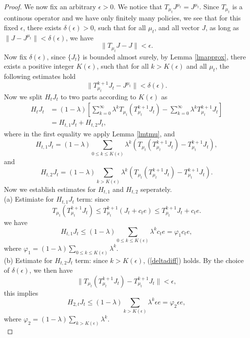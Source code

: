 \documentclass[12pt,a4paper]{amsart}
\numberwithin{equation}{section}
\theoremstyle{plain}
\theoremstyle{definition}
\begin{document}
\begin{proof}
	We now fix an arbitrary $\epsilon > 0$. We notice that $T_{\mu_t} J^{\mu_t}  = J^{\mu_t}$. Since $T_{\mu_t}$ is a continous operator and we have only finitely many policies, we see that for this fixed $\epsilon$, there exists $\delta(\epsilon) > 0$, such that for all $\mu_t$, and all vector $J$,  as long as $\|J - J^{\mu_t}\| < \delta(\epsilon)$, we have
	$$
	\| T_{\mu_t} J - J \| < \epsilon. 
	$$ 
	Now fix $\delta(\epsilon)$, since $\{J_t\}$ is bounded almost surely, by Lemma \ref{lmapprox},  there exists a positive integer $K(\epsilon)$, such that for all $k > K(\epsilon)$ and all $\mu_t$, the following estimates hold
	\begin{equation} \label{deltadiff}
	\| T_{\mu_t}^{k+1} J_t - J^{\mu_t}\| < \delta(\epsilon).
	\end{equation}
	Now we split $H_t J_t$ to two parts according to $K(\epsilon)$ as
	\begin{equation}\label{h1h2}
	\begin{aligned}
	H_t J_t & = (1-\lambda) \left[\sum_{k=0}^{\infty} \lambda^k T_{\mu_t} \left( T_{\mu_t}^{k+1} J_t \right)-  \sum_{k=0}^{\infty} \lambda^k T_{\mu_t}^{k+1} J_t \right]  \\
	& = H_{t, 1} J_t+ H_{t, 2} J_t,
	\end{aligned}
	\end{equation}
	where in the first equality we apply Lemma \ref{lmtmu}, and 
	$$
	H_{t, 1} J_t = (1-\lambda) \sum_{0 \le k\le K(\epsilon)} \lambda^k \left( T_{\mu_t} (T_{\mu_t}^{k+1} J_t) - T_{\mu_t}^{k+1}J_t \right), 
	$$
	and 
	$$
	H_{t, 2} J_t =  (1-\lambda) \sum_{k> K(\epsilon)} \lambda^k \left( T_{\mu_t} (T_{\mu_t}^{k+1} J_t) - T_{\mu_t}^{k+1}J_t \right). 
	$$
	Now we establish estimates for $H_{t,1}$ and $H_{t,2}$ seperately. \\
	
	(a) Estimiate for $H_{t,1}J_t$ term: since
	$$
	T_{\mu_t} \left(T_{\mu_t}^{k+1}J_t\right) \le T_{\mu_t}^{k+1} (J_t + c_t e) \le T_{\mu_t}^{k+1} J_t + c_t e. 
	$$
	we have
	\begin{equation} \label{ht1}
	H_{t,1} J_t \le (1-\lambda) \sum_{0 \le k \le K(\epsilon)} \lambda^k c_t e = \varphi_1 c_t e, 
	\end{equation}
	where $\varphi_1 = (1-\lambda) \sum_{0 \le k \le K(\epsilon)} \lambda^k$.  \\
	
	(b) Estimate for $H_{t,2}J_t$ term: since $k > K(\epsilon)$, (\ref{deltadiff}) holds. By the choice of $\delta(\epsilon)$, we then have
	$$
	\|T_{\mu_t} (T_{\mu_t}^{k+1} J_t) - T_{\mu_t}^{k+1}J_t\| < \epsilon, 
	$$
	this implies
	\begin{equation}  \label{ht2}
		H_{2, t}J_t \le (1-\lambda) \sum_{k > K(\epsilon)} \lambda^k \epsilon e = \varphi_2 \epsilon e,
	\end{equation}
	where $\varphi_2 = (1-\lambda) \sum_{k > K(\epsilon)} \lambda^k $.  \\
	

\end{proof}
\end{document}
